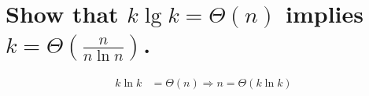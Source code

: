 \section[Problem 3]{Show that $k \lg k = \Theta(n)$ implies $k = \Theta\left(\frac{n}{n \ln n}\right)$.}
\begin{align*}
	k \ln k &= \Theta(n) \Longrightarrow n = \Theta(k \ln k) \\
\end{align*}
